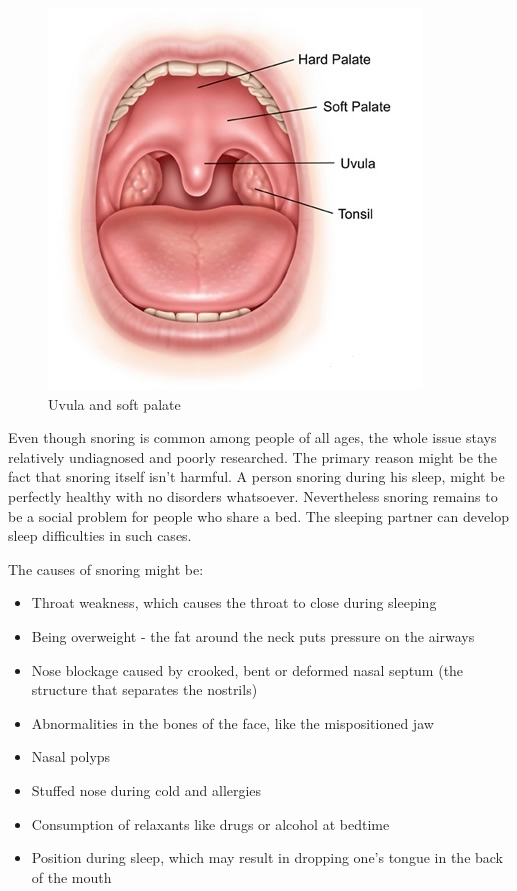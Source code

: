 \documentclass[12pt,a4paper]{report}
\begin{document}
\begin{figure}[h]
\centering
\includegraphics[max height=\textheight, max width=\textwidth, keepaspectratio, scale=0.5]{01_uvula_and_soft_palate.jpg}
\caption{Uvula and soft palate}
\label{fig:uvula_and_soft_palate}
\end{figure}


Even though snoring is common among people of all ages, the whole issue stays relatively undiagnosed and poorly researched. The primary reason might be the fact that snoring itself isn't harmful. A person snoring during his sleep, might be perfectly healthy with no disorders whatsoever. Nevertheless snoring remains to be a social problem for people who share a bed. The sleeping partner can develop sleep difficulties in such cases.

The causes of snoring might be:
\begin{itemize}
 \item Throat weakness, which causes the throat to close during sleeping
 \item Being overweight - the fat around the neck puts pressure on the airways
 \item Nose blockage caused by crooked, bent or deformed nasal septum (the structure that separates the nostrils)
 \item Abnormalities in the bones of the face, like the mispositioned jaw
 \item Nasal polyps
 \item Stuffed nose during cold and allergies
 \item Consumption of relaxants like drugs or alcohol at bedtime
 \item Position during sleep, which may result in dropping one's tongue in the back of the mouth
\end{itemize}
\end{document}
